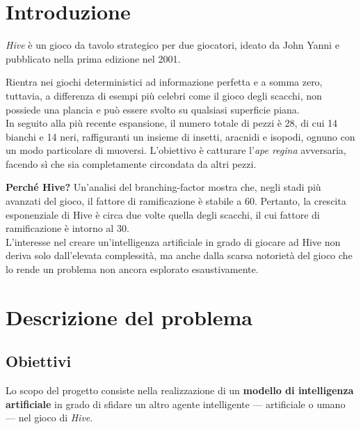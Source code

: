 \documentclass[a4paper,12pt]{article}
\begin{document}


    \tableofcontents
    \newpage



    \section{Introduzione}

    \textit{Hive} è un gioco da tavolo strategico per due giocatori, ideato da John Yanni e pubblicato nella prima edizione nel 2001.

    Rientra nei giochi deterministici ad informazione perfetta e a somma zero, tuttavia, a differenza di esempi più celebri come il gioco degli scacchi, non possiede una plancia e può essere svolto su qualsiasi superficie piana.\\
    In seguito alla più recente espansione, il numero totale di pezzi è 28,
    di cui 14 bianchi e 14 neri, raffiguranti un insieme di insetti, aracnidi e isopodi, ognuno con un modo particolare di muoversi.
    L'obiettivo è catturare l'\textit{ape regina} avversaria, facendo sì che sia completamente circondata da altri pezzi.

    \textbf{Perché Hive?} Un'analisi del branching-factor \cite{ai_for_hive} mostra che, negli stadi più avanzati del gioco, il fattore di ramificazione è stabile a 60.
    Pertanto, la crescita esponenziale di Hive è circa due volte quella degli scacchi, il cui fattore di ramificazione è intorno al 30.\\
    L'interesse nel creare un'intelligenza artificiale in grado di giocare ad Hive non deriva solo dall'elevata complessità, ma anche dalla scarsa notorietà del gioco che lo rende un problema non ancora esplorato esaustivamente.

    \newpage


    \section{Descrizione del problema}

    \subsection{Obiettivi}
    Lo scopo del progetto consiste nella realizzazione di un \textbf{modello di intelligenza artificiale} in grado di sfidare un altro agente intelligente --- artificiale o umano --- nel gioco di \textit{Hive}.
\end{document}
